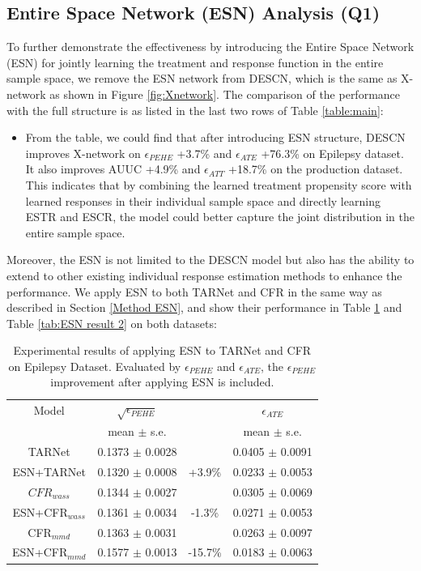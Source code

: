 \documentclass[sigconf]{acmart}
\begin{document}
\subsection{Entire Space Network (ESN) Analysis (Q1)}
\label{ESN Ablation}
To further demonstrate the effectiveness by introducing the Entire Space Network (ESN) for jointly learning the treatment and response function in the entire sample space, we remove the ESN network from DESCN, which is the same as X-network as shown in Figure \ref{fig:Xnetwork}. The comparison of the performance with the full structure is as listed in the last two rows of Table \ref{table:main}:
\begin{itemize}
    \item From the table, we could find that after introducing ESN structure, DESCN improves X-network on $\epsilon_{PEHE}$ +3.7\% and $\epsilon_{ATE}$ +76.3\% on Epilepsy dataset. It also improves AUUC +4.9\% and $\epsilon_{ATT}$ +18.7\% on the production dataset. This indicates that by combining the learned treatment propensity score with learned responses in their individual sample space and directly learning ESTR and ESCR, the model could better capture the joint distribution in the entire sample space.
\end{itemize}
Moreover, the ESN is not limited to the DESCN model but also has the ability to extend to other existing individual response estimation methods to enhance the performance. We apply ESN to both TARNet and CFR in the same way as described in Section \ref{Method ESN}, and show their performance in Table \ref{tab:ESN result} and Table \ref{tab:ESN result 2} on both datasets:

\begin{table}[h]
    \centering
    \begin{tabular}{cccc}
        \toprule
        Model & $\sqrt{\epsilon_{PEHE}}$ &  & $\epsilon_{ATE}$\\
         & mean $\pm$ s.e. &  & mean $\pm$ s.e.\\
        \midrule
        TARNet & 0.1373 $\pm$ 0.0028 &  & 0.0405 $\pm$ 0.0091\\
        ESN+TARNet & 0.1320 $\pm$ 0.0008 & +3.9\% & 0.0233 $\pm$ 0.0053\\
        \midrule
        $CFR_{wass}$ & 0.1344 $\pm$ 0.0027 &  & 0.0305 $\pm$ 0.0069\\
        ESN+CFR$_{wass}$ & 0.1361 $\pm$ 0.0034 & -1.3\% & 0.0271 $\pm$ 0.0053\\
        \midrule
        CFR$_{mmd}$ & 0.1363 $\pm$ 0.0031 &  & 0.0263 $\pm$ 0.0097\\
        ESN+CFR$_{mmd}$ & 0.1577 $\pm$ 0.0013 & -15.7\% & 0.0183 $\pm$ 0.0063\\
        \bottomrule
    \end{tabular}
    \caption{Experimental results of applying ESN to TARNet and CFR on Epilepsy Dataset. Evaluated by $\epsilon_{PEHE}$ and $\epsilon_{ATE}$, the $\epsilon_{PEHE}$ improvement after applying ESN is included.}
    \label{tab:ESN result}
    \vspace{-0.5cm}
\end{table}
\end{document}
